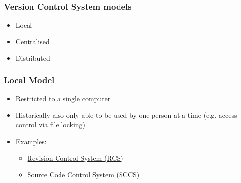\documentclass{git_course}
\begin{document}
\begin{frame}
    \frametitle{Version Control System models}
    \begin{itemize}
        \item Local
        \item Centralised
        \item Distributed
    \end{itemize}
\end{frame}

\begin{frame}
\frametitle{Local Model}
\begin{itemize}
    \item Restricted to a single computer
    \item Historically also only able to be used by one person at a time
        (e.g. access control via file locking)
    \item Examples:
        \begin{itemize}
            \item \href{https://en.wikipedia.org/wiki/Revision_Control_System}
                       {Revision Control System (RCS)}
            \item \href{https://en.wikipedia.org/wiki/Source_Code_Control_System}
                       {Source Code Control System (SCCS)}
        \end{itemize}
\end{itemize}
\end{frame}
\end{document}
